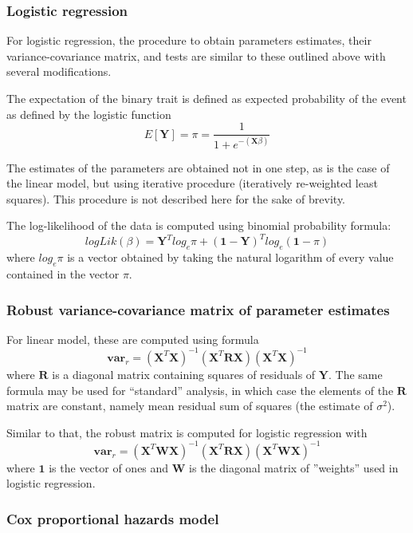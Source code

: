 \documentclass[12pt]{article}
\begin{document}
\subsubsection{Logistic regression}

For logistic regression, the procedure to obtain 
parameters estimates, their variance-covariance matrix, and tests are 
similar to these outlined above with several modifications. 

The expectation of the binary trait is defined as expected 
probability of the event as defined by the logistic 
function 
$$
E[\mathbf{Y}] = \pi = \frac{ 1 }{ 1 + e^{-(\mathbf{X}\beta)} }
$$

The estimates of the parameters are obtained not in one 
step, as is the case of the linear model, but using iterative 
procedure (iteratively re-weighted least squares). This 
procedure is not described here for the sake of brevity. 

The log-likelihood of the data is computed using 
binomial probability formula:
$$
logLik(\beta) = \mathbf{Y}^T log_e \pi + (\mathbf{1} - \mathbf{Y})^T log_e (\mathbf{1}-\pi)
$$
where $log_e \pi$ is a vector obtained by taking the natural logarithm of every 
value contained in the vector $\pi$. 

\subsubsection{Robust variance-covariance matrix of parameter estimates}

For linear model, these are computed using formula
$$
\mathbf{var}_r = (\mathbf{X}^T\mathbf{X})^{-1} (\mathbf{X}^T\mathbf{R}\mathbf{X})
(\mathbf{X}^T\mathbf{X})^{-1}
$$
where $\mathbf{R}$ is a diagonal matrix containing squares of residuals
of $\mathbf{Y}$. The 
same formula may be used for ``standard'' analysis, in which case
the elements of the $\mathbf{R}$ matrix are constant, namely mean 
residual sum of squares (the estimate of $\sigma^2$).

Similar to that, the robust matrix is computed for logistic regression with
$$
\mathbf{var}_r = (\mathbf{X}^T \mathbf{W} \mathbf{X})^{-1} (\mathbf{X}^T\mathbf{R}\mathbf{X})
(\mathbf{X}^T \mathbf{W} \mathbf{X})^{-1}
$$
where $\mathbf{1}$ is the vector of ones and $\mathbf{W}$ is the diagonal matrix 
of ''weights'' used in logistic regression. 


\subsubsection{Cox proportional hazards model}
\end{document}
